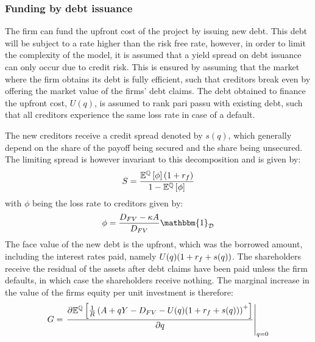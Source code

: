 \documentclass[../main.tex]{subfiles}
\begin{document}
    \subsubsection{Funding by debt issuance}
        The firm can fund the upfront cost of the project by issuing new debt.
        This debt will be subject to a rate higher than the risk free rate, 
        however, in order to limit the complexity of the model, 
        it is assumed that a yield spread on debt issuance can only occur due to credit risk. 
        This is ensured by assuming that the market where the firm obtains its debt is fully efficient, 
        such that creditors break even by offering the market value of the firms' debt claims.
        The debt obtained to finance the upfront cost, $U(q)$, is assumed to rank pari passu with existing debt, 
        such that all creditors experience the same loss rate in case of a default.

        The new creditors receive a credit spread denoted by $s(q)$,
        which generally depend on the share of the payoff being secured and the share being unsecured.
        The limiting spread is however invariant to this decomposition and is given by:
            \begin{equation}
                S = \frac{
                    \mathbb{E}^{\mathbb{Q}}\left[\phi\right] 
                    (1 + r_{f})
                }{
                    1 - \mathbb{E}^{\mathbb{Q}}\left[\phi\right]
                }
            \end{equation}
        with $\phi$ being the loss rate to creditors given by:
            \begin{equation}
                \phi = \frac{
                        D_{FV} - \kappa A
                    }{
                        D_{FV}
                    } 
                \mathbbm{1}_{\mathcal{D}}
            \end{equation}
        The face value of the new debt is the upfront, which was the borrowed amount, 
        including the interest rates paid, namely 
        $U(q)(1 + r_{f} + s(q))$. 
        The shareholders receive the residual of the assets after debt claims have been paid
        unless the firm defaults, in which case the shareholders receive nothing. 
        The marginal increase in the value of the firms equity per unit investment is therefore:
            \begin{equation}
                G = 
                \left.
                \frac{
                    \partial 
                    \mathbb{E}^{\mathbb{Q}}\left[
                        \frac{1}{R} 
                        \left(
                            A + qY - D_{FV} - U(q)(1 + r_{f} + s(q))
                        \right)^{+}
                    \right] 
                }{
                    \partial 
                    q
                }
                \right\rvert_{q=0} 
            \end{equation}
        
\end{document}
